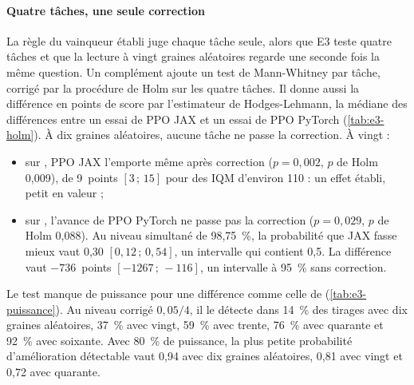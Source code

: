 \paragraph{Quatre tâches, une seule correction}
La règle du vainqueur établi juge chaque tâche seule, alors que E3 teste quatre tâches et que la lecture à
vingt graines aléatoires regarde une seconde fois la même question. Un complément ajoute un test de Mann-Whitney par tâche, corrigé par la procédure de Holm sur les quatre tâches. Il donne aussi
la différence en points de score par l'estimateur de Hodges-Lehmann, la médiane des différences entre un essai de PPO JAX et
un essai de PPO PyTorch (\cref{tab:e3-holm}). À dix graines aléatoires, aucune tâche ne passe la correction.
À vingt :
\begin{itemize}
  \item sur , PPO JAX l'emporte même après correction ($p = 0{,}002$, $p$ de Holm 0,009), de
    9~points $[3\,;\,15]$ pour des IQM d'environ 110 : un effet établi, petit en valeur ;
  \item sur , l'avance de PPO PyTorch ne passe pas la correction ($p = 0{,}029$, $p$ de Holm
    0,088). Au niveau simultané de 98,75~\%, la probabilité que JAX fasse mieux vaut 0,30
    $[0{,}12\,;\,0{,}54]$, un intervalle qui contient 0,5. La différence vaut $-736$~points $[-\num{1267}\,;\,-116]$,
    un intervalle à 95~\% sans correction.
\end{itemize}
Le test manque de puissance pour une différence comme celle de  (\cref{tab:e3-puissance}). Au niveau
corrigé $0{,}05/4$, il le détecte dans 14~\% des tirages avec dix graines aléatoires, 37~\% avec vingt, 59~\%
avec trente, 76~\% avec quarante et 92~\% avec soixante. Avec 80~\% de puissance, la plus petite probabilité
d'amélioration détectable vaut 0,94 avec dix graines aléatoires, 0,81 avec vingt et 0,72 avec quarante.



